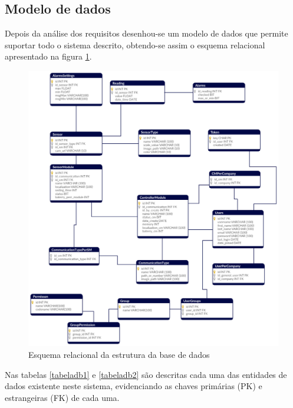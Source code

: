 \newpage
\subsection{Modelo de dados}
\label{modelocap}

Depois da análise dos requisitos desenhou-se um modelo de dados que permite suportar todo o sistema descrito, obtendo-se assim o esquema relacional apresentado na figura \ref{esquemarelacional}.

\begin{figure}[!htb]
	\centering
	\includegraphics[width=\linewidth]{esquemas/database_tese.pdf}
	\caption{Esquema relacional da estrutura da base de dados}
	\label{esquemarelacional}
\end{figure}


Nas tabelas \ref{tabeladb1} e \ref{tabeladb2} são descritas cada uma das entidades de dados existente neste sistema, evidenciando as chaves primárias (\ac{PK}) e estrangeiras (\ac{FK}) de cada uma. 

